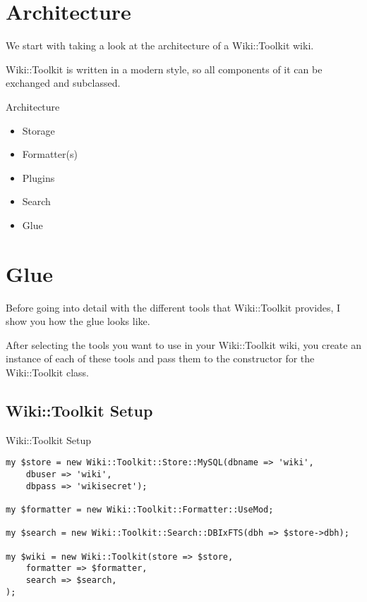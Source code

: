 \section{Architecture}


We start with taking a look at the architecture of a Wiki::Toolkit wiki.

Wiki::Toolkit is written in a modern style, so all components of
it can be exchanged and subclassed.

\begin{frame}{Architecture}
 \begin{itemize}
  \item Storage
  \item Formatter(s)
  \item Plugins
  \item Search
  \item Glue
 \end{itemize}
\end{frame}


\section{Glue}

Before going into detail with the different tools that Wiki::Toolkit
provides, I show you how the glue looks like.

After selecting the tools you want to use in your Wiki::Toolkit wiki,
you create an instance of each of these tools and pass them to
the constructor for the Wiki::Toolkit class.

\subsection{Wiki::Toolkit Setup}

\begin{frame}[fragile]{Wiki::Toolkit Setup}
\begin{lstlisting}
my $store = new Wiki::Toolkit::Store::MySQL(dbname => 'wiki',
    dbuser => 'wiki',
    dbpass => 'wikisecret');

my $formatter = new Wiki::Toolkit::Formatter::UseMod;

my $search = new Wiki::Toolkit::Search::DBIxFTS(dbh => $store->dbh);

my $wiki = new Wiki::Toolkit(store => $store,
    formatter => $formatter,
    search => $search,
);
\end{lstlisting}
\end{frame}

